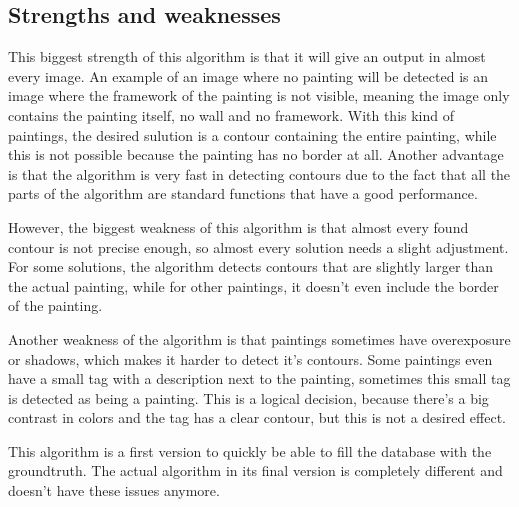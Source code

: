 \subsection{Strengths and weaknesses}

This biggest strength of this algorithm is that it will give an output in almost every image. An example of an image where no painting will be detected is an image where the framework of the painting is not visible, meaning the image only contains the painting itself, no wall and no framework. With this kind of paintings, the desired sulution is a contour containing the entire painting, while this is not possible because the painting has no border at all. Another advantage is that the algorithm is very fast in detecting contours due to the fact that all the parts of the algorithm are standard functions that have a good performance.

However, the biggest weakness of this algorithm is that almost every found contour is not precise enough, so almost every solution needs a slight adjustment. For some solutions, the algorithm detects contours that are slightly larger than the actual painting, while for other paintings, it doesn't even include the border of the painting.

Another weakness of the algorithm is that paintings sometimes have overexposure or shadows, which makes it harder to detect it's contours. Some paintings even have a small tag with a description next to the painting, sometimes this small tag is detected as being a painting. This is a logical decision, because there's a big contrast in colors and the tag has a clear contour, but this is not a desired effect.

This algorithm is a first version to quickly be able to fill the database with the groundtruth. The actual algorithm in its final version is completely different and doesn't have these issues anymore.
